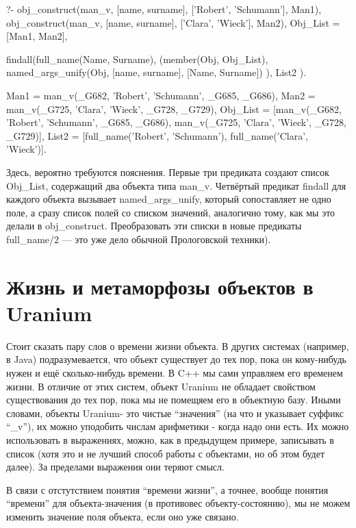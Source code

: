 \documentclass[a4paper]{book}
\def\ur{Uranium}
\begin{document}
\begin{bigexample}{}{}
?- obj_construct(man_v, [name, surname], ['Robert', 'Schumann'],
                 Man1), 
   obj_construct(man_v, [name, surname], ['Clara', 'Wieck'],
                 Man2),
   Obj_List = [Man1, Man2], 

   findall(full_name(Name, Surname), 
           (member(Obj, Obj_List), 
            named_args_unify(Obj, [name, surname], 
                                  [Name, Surname])
            ), 
           List2
           ).

Man1 = man_v(_G682, 'Robert', 'Schumann', _G685, _G686),
Man2 = man_v(_G725, 'Clara', 'Wieck', _G728, _G729),
Obj_List = [man_v(_G682, 'Robert', 'Schumann', _G685, _G686), 
            man_v(_G725, 'Clara', 'Wieck', _G728, _G729)],
List2 = [full_name('Robert', 'Schumann'), 
         full_name('Clara', 'Wieck')].
\end{bigexample}

Здесь, вероятно требуются пояснения.  Первые три предиката
создают список Obj\_List, содержащий два объекта типа
man\_v. Четвёртый предикат findall для каждого объекта вызывает
named\_args\_unify, который сопоставляет не одно поле, а сразу
список полей со списком значений, аналогично тому, как мы это
делали в obj\_construct. Преобразовать эти списки в новые
предикаты full\_name/2 --- это уже дело обычной Прологовской
техники).

\section{Жизнь и метаморфозы объектов в \ur}
\label{object_life}

Стоит сказать пару слов о времени жизни объекта. В других
системах (например, в Java) подразумевается, что объект
существует до тех пор, пока он кому-нибудь нужен и ещё
сколько-нибудь времени. В C++ мы сами управляем его временем
жизни. В отличие от этих систем, объект \ur{} не обладает
свойством существования до тех пор, пока мы не помещяем его в
объектную базу. Иными словами, объекты \ur - это чистые
``значения'' (на что и указывает суффикс ``\_v''), их можно
уподобить числам арифметики - когда надо они есть. Их можно
использовать в выражениях, можно, как в предыдущем примере,
записывать в список (хотя это и не лучший способ работы с
объектами, но об этом будет далее). За пределами выражения они
теряют смысл.

В связи с отстутствием понятия ``времени жизни'', а точнее,
вообще понятия ``времени'' для объекта-значения (в противовес
объекту-состоянию), мы не можем изменить значение поля объекта,
если оно уже связано.
\end{document}
